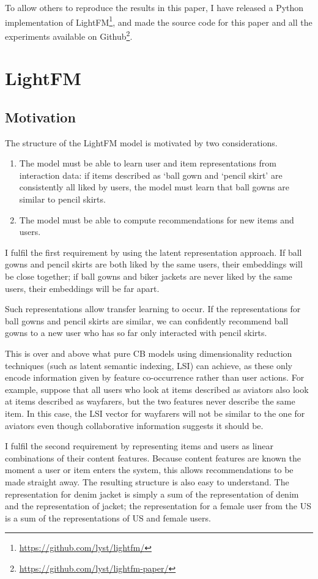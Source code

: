 \documentclass{sig-alternate}
\providecommand\varLightFMRepoLink{\url{https://github.com/lyst/lightfm/}}
\providecommand\varPaperRepoLink{\url{https://github.com/lyst/lightfm-paper/}}
\begin{document}
To allow others to reproduce the results in this paper, I have released a Python implementation of LightFM\footnote{\varLightFMRepoLink}, and made the source code for this paper and all the experiments available on Github\footnote{\varPaperRepoLink}.

\section{LightFM}
\label{sec:model}
\subsection{Motivation}
The structure of the LightFM model is motivated by two considerations.
\begin{enumerate}
\item The model must be able to learn user and item representations from interaction data: if items described as `ball gown and `pencil skirt' are consistently all liked by users, the model must learn that ball gowns are similar to pencil skirts.
\item The model must be able to compute recommendations for new items and users.
\end{enumerate}
I fulfil the first requirement by using the latent representation approach. If ball gowns and pencil skirts are both liked by the same users, their embeddings will be close together; if ball gowns and biker jackets are never liked by the same users, their embeddings will be far apart.

Such representations allow transfer learning to occur. If the representations for ball gowns and pencil skirts are similar, we can confidently recommend ball gowns to a new user who has so far only interacted with pencil skirts.

This is over and above what pure CB models using dimensionality reduction techniques (such as latent semantic indexing, LSI) can achieve, as these only encode information given by feature co-occurrence rather than user actions. For example, suppose that all users who look at items described as aviators also look at items described as wayfarers, but the two features never describe the same item. In this case, the LSI vector for wayfarers will not be similar to the one for aviators even though collaborative information suggests it should be.

I fulfil the second requirement by representing items and users as linear combinations of their content features. Because content features are known the moment a user or item enters the system, this allows recommendations to be made straight away. The resulting structure is also easy to understand. The representation for denim jacket is simply a sum of the representation of denim and the representation of jacket; the representation for a female user from the US is a sum of the representations of US and female users.
\end{document}

